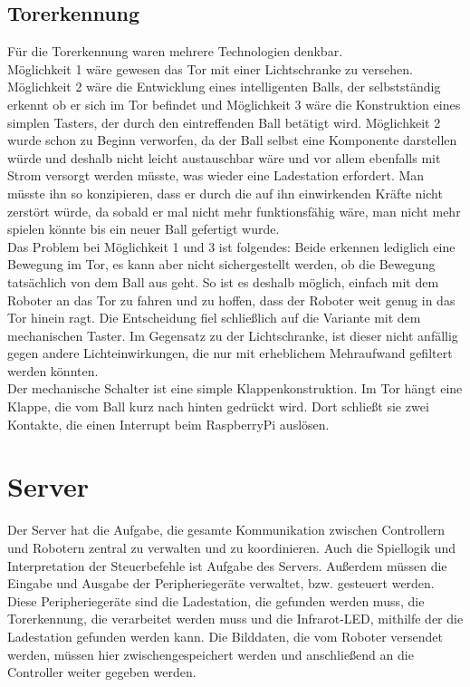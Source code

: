 \subsection{Torerkennung}
Für die Torerkennung waren mehrere Technologien denkbar. \\
Möglichkeit 1 wäre gewesen das Tor mit einer Lichtschranke zu versehen. Möglichkeit 2 wäre die Entwicklung eines intelligenten Balls, der selbstständig erkennt ob er sich im Tor befindet und Möglichkeit 3 wäre die Konstruktion eines simplen Tasters, der durch den eintreffenden Ball betätigt wird.
Möglichkeit 2 wurde schon zu Beginn verworfen, da der Ball selbst eine Komponente darstellen würde und deshalb nicht leicht austauschbar wäre und vor allem ebenfalls mit Strom versorgt werden müsste, was wieder eine Ladestation erfordert. Man müsste ihn so konzipieren, dass er durch die auf ihn einwirkenden Kräfte nicht zerstört würde, da sobald er mal nicht mehr funktionsfähig wäre, man nicht mehr spielen könnte bis ein neuer Ball gefertigt wurde. \\
Das Problem bei Möglichkeit 1 und 3 ist folgendes: Beide erkennen lediglich eine Bewegung im Tor, es kann aber nicht sichergestellt werden, ob die Bewegung tatsächlich von dem Ball aus geht. So ist es deshalb möglich, einfach mit dem Roboter an das Tor zu fahren und zu hoffen, dass der Roboter weit genug in das Tor hinein ragt. Die Entscheidung fiel schließlich auf die Variante mit dem mechanischen Taster. Im Gegensatz zu der Lichtschranke, ist dieser nicht anfällig gegen andere Lichteinwirkungen, die nur mit erheblichem Mehraufwand gefiltert werden könnten. \\
Der mechanische Schalter ist eine simple \glqq Klappenkonstruktion\grqq. Im Tor hängt eine Klappe, die vom Ball kurz nach hinten gedrückt wird. Dort schließt sie zwei Kontakte, die einen Interrupt beim RaspberryPi auslösen.

\section{Server}
\label{impl:server}
Der Server hat die Aufgabe, die gesamte Kommunikation zwischen Controllern und Robotern zentral zu verwalten und zu koordinieren. Auch die Spiellogik und Interpretation der Steuerbefehle ist Aufgabe des Servers. Außerdem müssen die Eingabe und Ausgabe der Peripheriegeräte verwaltet, bzw. gesteuert werden. Diese Peripheriegeräte sind die Ladestation, die gefunden werden muss, die Torerkennung, die verarbeitet werden muss und die Infrarot-LED, mithilfe der die Ladestation gefunden werden kann. Die Bilddaten, die vom Roboter versendet werden, müssen hier zwischengespeichert werden und anschließend an die Controller weiter gegeben werden.

